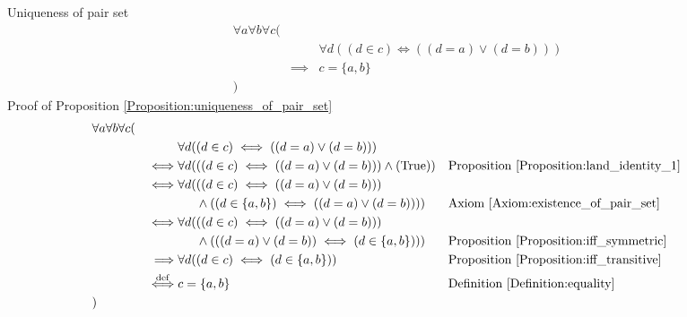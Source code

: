 \begin{prop}
\label{Proposition:uniqueness_of_pair_set}
Uniqueness of pair set
\begin{align*}
& \forall a \forall b \forall c ( \\
& & & \forall d ((d \in c) \iff ((d = a) \lor (d = b))) \\
& & \implies & c = \{ a , b \} \\
& )
\end{align*}
Proof of Proposition \ref{Proposition:uniqueness_of_pair_set}
\begin{align*}
& \forall a \forall b \forall c ( \\
& & & \forall d ((d \in c) \iff ((d = a) \lor (d = b))) \\
& & \iff & \forall d (((d \in c) \iff ((d = a) \lor (d = b))) \land (\text{True}))
& & \text{Proposition \ref{Proposition:land_identity_1}} \\
& & \iff & \forall d (((d \in c) \iff ((d = a) \lor (d = b))) \\
& & & \phantom{\forall d (} \land ((d \in \{ a , b \}) \iff ((d = a) \lor (d = b))))
& & \text{Axiom \ref{Axiom:existence_of_pair_set}} \\
& & \iff & \forall d (((d \in c) \iff ((d = a) \lor (d = b))) \\
& & & \phantom{\forall d (} \land (((d = a) \lor (d = b)) \iff (d \in \{ a , b \})))
& & \text{Proposition \ref{Proposition:iff_symmetric}} \\
& & \implies & \forall d ((d \in c) \iff (d \in \{ a , b \}))
& & \text{Proposition \ref{Proposition:iff_transitive}} \\
& & \overset{\operatorname{def}}{\iff} & c = \{ a , b \}
& & \text{Definition \ref{Definition:equality}} \\
& )
\end{align*}
\end{prop}

